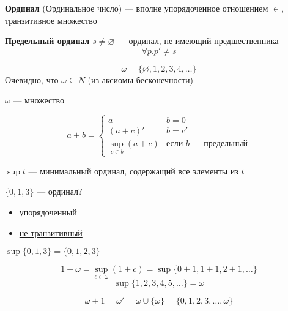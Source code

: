 \documentclass[english]{article}
\begin{document}
\begin{definition}
	\textbf{Ординал} (Ординальное число) --- вполне упорядоченное отношением \(\in\), транзитивное множество
	\label{orga75a597}
\end{definition}
\begin{definition}
	\textbf{Предельный ординал} \(s \neq \varnothing\) --- ординал, не имеющий предшественника
	\[ \forall p. p' \neq s \]
	\label{org814664c}
\end{definition}
\begin{examp}
	\[ \omega = \{\varnothing, 1, 2, 3, 4, \dots\} \]
	Очевидно, что \(\omega \subseteq N\) (из \hyperref[orgd559ac7]{аксиомы бесконечности})
	\label{orgb4e2af9}
\end{examp}
\begin{theorem}
	\(\omega\) --- множество
	\label{orgf8c5c93}
\end{theorem}
\begin{definition}
	\[ a + b = \begin{cases}
			a                            & b = 0                               \\
			(a + c)'                     & b = c'                              \\
			\sup\limits_{c \in b}(a + c) & \text{если }b\text{ --- предельный}
		\end{cases} \]
	\label{org85b4e0c}
\end{definition}
\begin{definition}
	\(\sup t\) --- минимальный ординал, содержащий все элементы из \(t\)
	\label{orgb6e1e1c}
\end{definition}
\begin{examp}
	\(\{0, 1, 3\}\) --- ординал?
	\begin{itemize}
		\item упорядоченный
		\item \uline{не транзитивный}
	\end{itemize}
	\(\sup \{0, 1, 3\} = \{0, 1, 2, 3\}\)
\end{examp}
\begin{examp}
	\[1 + \omega = \sup\limits_{c \in \omega}(1 + c) = \sup \{0 + 1, 1 + 1, 2+ 1, \dots\}\]
	\[ \sup \{1, 2, 3, 4, 5, \dots\} = \omega \]
	\label{orgb9de87e}
\end{examp}
\begin{examp}
	\[ \omega + 1 = \omega' = \omega \cup \{\omega\} = \{0, 1, 2, 3, \dots, \omega\} \]
	\label{orga650da3}
\end{examp}
\end{document}
